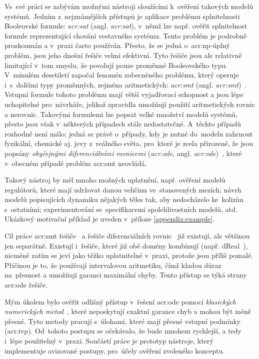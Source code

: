 \documentclass[thesis=M,czech]{FITthesis}[2012/06/26]
\newcommand{\acrlabel}[1]{acr:#1}
\newcommand{\acr}[1]{\acrshort{\acrlabel{#1}}}
\newcommand{\acrl}[1]{\acrlong{\acrlabel{#1}}}
\newcommand{\hl}[1]{\textit{#1}}
\newcommand{\name}[1]{\hl{#1}}
\newcommand{\cit}[1]{\cite{#1}}
\newcommand{\rf}[1]{\ref{#1}}
\begin{document}
\begin{introduction}
Ve~své práci se zabývám možnými nástroji
sloužícími k~ověření takových modelů systémů.
Jedním z~nejznámějších přístupů
je aplikace problému splnitelnosti Booleovské formule:
\name{\acr{sat}} (angl. \name{\acrl{sat}}),
v~němž lze např. ověřit splnitelnost
formule reprezentující chování vestavného systému.
Tento problém je podrobně prozkoumán
a v~praxi často používán.
Přesto, že se jedná o~\acr{np}-úplný problém,
jsou jeho dnešní řešiče velmi efektivní.
Tyto řešiče jsou ale relativně limitující
v~tom smyslu, že povolují pouze proměnné Booleovského typu.
V~minulém desetiletí započal fenomén
zobecněného problému,
který operuje i~s~dalšími typy proměnných,
zejména aritmetických: \name{\acr{smt}}
(angl. \name{\acrl{smt}})~\cit{smt-de_moura}\cit{smt}.
Vstupní formule tohoto problému mají
větší vyjadřovací schopnost
a jsou lépe uchopitelné pro~návrháře,
jelikož zpravidla umožňují použití
aritmetických rovnic a nerovnic.
Takovými formulemi lze popsat velké množství modelů systémů,
přesto jsou však v~některých případech stále nedostatečné.
A~těchto případů rozhodně není málo:
jedná se právě o~případy, kdy je nutné
do~modelu zahrnout fyzikální, chemické aj.
jevy z~reálného světa,
pro~které je zcela přirozené,
že jsou popsány \name{obyčejnými diferenciálními rovnicemi}
(\name{\acr{ode}}, angl. \name{\acrl{ode}})~\cit{ode-lec}\cit{ode},
které v~obecném případě problém \acr{smt} neovládá.

Takový nástroj by měl mnoho možných uplatnění,
např. ověření modelů regulátorů,
které mají udržovat danou veličinu ve~stanovených mezích;
návrh modelů popisujících dynamiku nějakých těles
tak, aby nedocházelo ke~kolizím s~ostatními;
experimentování se~specifikacemi
spolehlivostních modelů,
atd.
Ukázkový motivační příklad je uveden
v~příloze \rf{appendix:example}.


\begin{section}{Cíl práce}\label{s:intro:goal}
\acr{smt} řešiče~\cit{opensmt-art}\cit{cvc4-art}
a řešiče diferenciálních rovnic~\cit{sundials-art}\cit{odeint-art}
již existují, ale většinou jen separátně.
Existují i~řešiče, které již obě domény kombinují
(např. dReal~\cit{dreal-art}),
nicméně zatím se jeví jako těžko uplatnitelné v~praxi,
protože jsou příliš pomalé.
Příčinou je to, že používají intervalovou aritmetiku,
čímž kladou důraz na~přesnost
a umožňují garanci maximální chyby.
Tento přístup se týká strany
\acr{ode} řešiče.

Mým úkolem bylo ověřit
odlišný přístup v~řešení \acr{ode}
pomocí \name{klasických numerických metod}~\cit{ode-nsolve-intro},
které neposkytují exaktní garance chyb
a mohou být méně přesné.
Tyto metody pracují s~úlohami,
které mají přesné vstupní podmínky (\acr{ivp}).
Od~tohoto postupu se očekávalo,
že bude mnohem rychlejší,
a tedy i~lépe použitelný v~praxi.
Součástí práce je prototyp nástroje,
který implementuje avizované postupy,
pro~účely ověření zvoleného konceptu.


\end{section}
\end{introduction}
\end{document}
